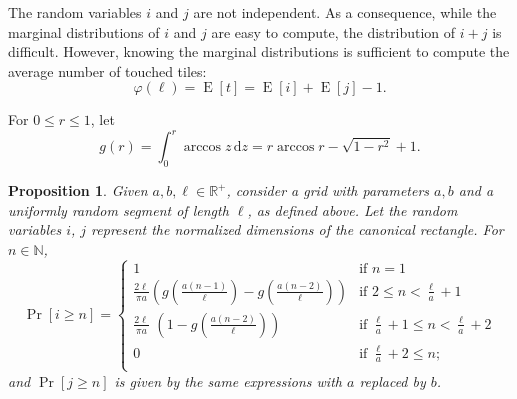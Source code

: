 \documentclass[12pt, a4paper]{article}
\newcommand{\diff}{\,\mathrm d}
\DeclareMathOperator{\E}{E}
\newcommand{\funta}{\varphi} %
\newcommand{\len}{\ell} %
\newcommand{\genvar}{r}
\newtheorem{proposition}{Proposition}%
\begin{document}
The random variables $i$ and $j$ are not independent. As a consequence, while the marginal distributions of $i$ and $j$ are easy to compute, the distribution of $i+j$ is difficult. However, knowing the marginal distributions is sufficient to compute the average number of touched tiles:
\begin{equation}
\label{eq: funta E[i] E[j]}
\funta(\len) = \E[t] = \E[i]+\E[j]-1.
\end{equation}

For $0 \leq \genvar \leq 1$, let
\begin{equation}
\label{eq: g}
g(\genvar) = \int_0^r \arccos z \diff z = \genvar \arccos \genvar - \sqrt{1-\genvar^2} + 1.
\end{equation}

\begin{proposition}
\label{prop: Pr i}
Given $a, b, \len \in \mathbb R^+$, consider a grid with parameters $a, b$ and a uniformly random segment of length $\len$, as defined above. Let the random variables $i$, $j$ represent the normalized dimensions of the canonical rectangle. For $n \in \mathbb N$,
\begin{equation}
\label{eq: Pr i geq n}
\Pr[i \geq n] = \begin{cases}
\displaystyle
1 &\text{if\ \ } \displaystyle n =1 \\[1 mm]
\displaystyle
\frac{2\len}{\pi a} \left(g\left(\frac{a(n-1)}{\len}\right)-g\left(\frac{a(n-2)}{\len} \right)\right) &\text{if\ \ } \displaystyle 2 \leq n < \frac \len a + 1 \\[4 mm]
\displaystyle
\frac{2\len}{\pi a}\,\, \left(1 - g\left(\frac{a(n-2)}{\len}\right)\right) &\text{if\ \ } \displaystyle \frac\len a + 1 \leq n < \frac\len a+2 \\[3 mm]
\displaystyle
0 &\text{if\ \ } \displaystyle \frac \len a + 2 \leq  n; \\
\end{cases}
\end{equation}
and $\Pr[j \geq n]$ is given by the same expressions with $a$ replaced by $b$.
\end{proposition}
\end{document}
